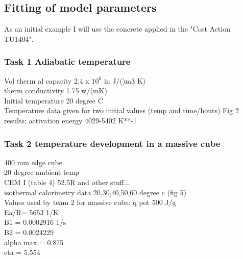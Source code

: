 \subsection{Fitting of model parameters}
As an initial example I will use the concrete applied in the "Cost Action TU1404".
\subsubsection{Task 1 Adiabatic temperature}
Vol therm al capacity 2.4 x $10^6$ in J/()m3 K)\\
therm conductivity 1.75 w/(mK)\\
Initial temperature 20 degree C\\ 
Temperature data given for two initial values (temp and time/hours) Fig 2\\
results: activation energy 4029-5402 K**-1

\subsubsection{Task 2 temperature development in a massive cube}
400 mm edge cube\\
20 degree ambient temp\\
CEM I (table 4) 52.5R and other stuff...\\
isothermal calorimetry data 20,30,40,50,60 degree c (fig 5)\\
Values used by team 2 for massive cube:
q pot 500 J/g\\
Ea/R= 5653 1/K\\
B1 = 0.0002916 1/s\\
B2 = 0.0024229\\
alpha max = 0.875\\
eta = 5.554
